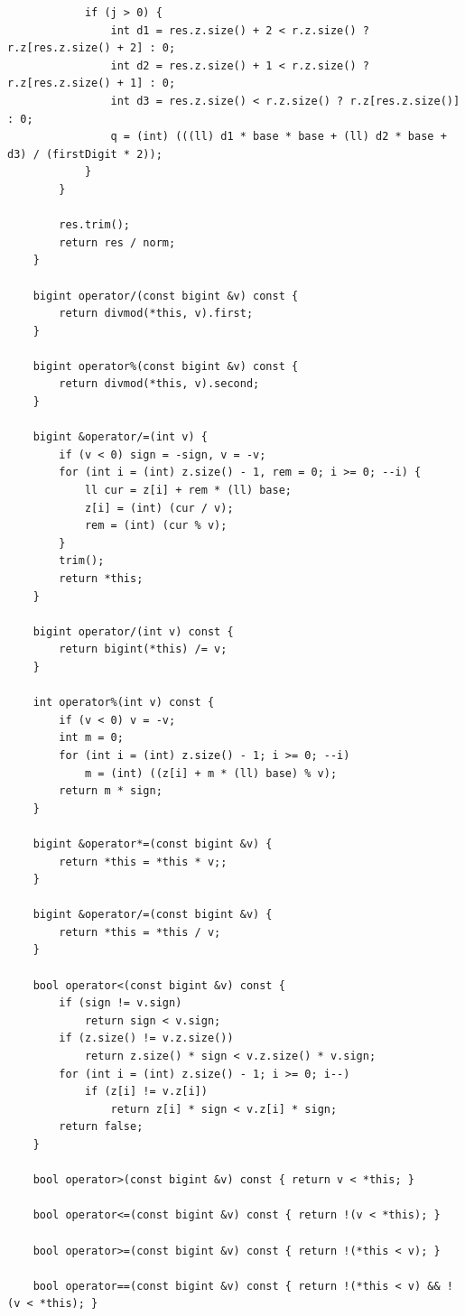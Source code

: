 \documentclass[twoside]{article}
\begin{document}
\begin{lstlisting}
            if (j > 0) {
                int d1 = res.z.size() + 2 < r.z.size() ? r.z[res.z.size() + 2] : 0;
                int d2 = res.z.size() + 1 < r.z.size() ? r.z[res.z.size() + 1] : 0;
                int d3 = res.z.size() < r.z.size() ? r.z[res.z.size()] : 0;
                q = (int) (((ll) d1 * base * base + (ll) d2 * base + d3) / (firstDigit * 2));
            }
        }

        res.trim();
        return res / norm;
    }

    bigint operator/(const bigint &v) const {
        return divmod(*this, v).first;
    }

    bigint operator%(const bigint &v) const {
        return divmod(*this, v).second;
    }

    bigint &operator/=(int v) {
        if (v < 0) sign = -sign, v = -v;
        for (int i = (int) z.size() - 1, rem = 0; i >= 0; --i) {
            ll cur = z[i] + rem * (ll) base;
            z[i] = (int) (cur / v);
            rem = (int) (cur % v);
        }
        trim();
        return *this;
    }

    bigint operator/(int v) const {
        return bigint(*this) /= v;
    }

    int operator%(int v) const {
        if (v < 0) v = -v;
        int m = 0;
        for (int i = (int) z.size() - 1; i >= 0; --i)
            m = (int) ((z[i] + m * (ll) base) % v);
        return m * sign;
    }

    bigint &operator*=(const bigint &v) {
        return *this = *this * v;;
    }

    bigint &operator/=(const bigint &v) {
        return *this = *this / v;
    }

    bool operator<(const bigint &v) const {
        if (sign != v.sign)
            return sign < v.sign;
        if (z.size() != v.z.size())
            return z.size() * sign < v.z.size() * v.sign;
        for (int i = (int) z.size() - 1; i >= 0; i--)
            if (z[i] != v.z[i])
                return z[i] * sign < v.z[i] * sign;
        return false;
    }

    bool operator>(const bigint &v) const { return v < *this; }

    bool operator<=(const bigint &v) const { return !(v < *this); }

    bool operator>=(const bigint &v) const { return !(*this < v); }

    bool operator==(const bigint &v) const { return !(*this < v) && !(v < *this); }


\end{lstlisting}
\end{document}
